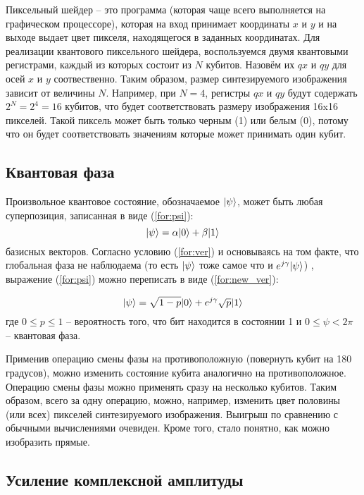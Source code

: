 Пиксельный шейдер -- это программа (которая чаще всего выполняется на графическом процессоре), которая на вход принимает координаты $x$ и $y$ и на выходе выдает цвет пикселя, находящегося в заданных координатах. Для реализации квантового пиксельного шейдера, воспользуемся двумя квантовыми регистрами, каждый из которых состоит из $N$ кубитов. Назовём их $qx$ и $qy$ для осей $x$ и $y$ соотвественно. Таким образом, размер синтезируемого изображения зависит от величины $N$. Например, при $N = 4$, регистры $qx$ и $qy$ будут содержать $2^N = 2^4 = 16$ кубитов, что будет соответствовать размеру изображения 16x16 пикселей. Такой пиксель может быть только черным (1) или белым (0), потому что он будет соответствовать значениям которые может принимать один кубит. 

\subsection{Квантовая фаза}

Произвольное квантовое состояние, обозначаемое $\lvert\psi\rangle$, может быть любая суперпозиция, записанная в виде (\ref{for:psi}):
\begin{equation}
\label{for:psi}
\lvert\psi\rangle = \alpha\lvert0\rangle + \beta\lvert1\rangle
\end{equation}
 базисных векторов. Согласно условию (\ref{for:ver}) и основываясь на том факте, что глобальная фаза не наблюдаема (то есть $\lvert\psi\rangle$ тоже самое что и $e^{j\gamma}\lvert\psi\rangle$) \cite{global-phase}, выражение (\ref{for:psi}) можно переписать в виде (\ref{for:new_ver}):
 
\begin{equation} 
\label{for:new_ver}
\lvert\psi\rangle = \sqrt{1 - p}\lvert0\rangle + e^{j\gamma}\sqrt{p}\lvert1\rangle
\end{equation} где $0 \leq p \leq 1$ -- вероятность того, что бит находится в состоянии 1 и $0 \leq \psi < 2\pi$ -- квантовая фаза.

Применив операцию смены фазы на противоположную (повернуть кубит на 180 градусов), можно изменить состояние кубита аналогично на противоположное. Операцию смены фазы можно применять сразу на несколько кубитов. Таким образом, всего за одну операцию, можно, например, изменить цвет половины (или всех) пикселей синтезируемого изображения. Выигрыш по сравнению с обычными вычислениями очевиден. Кроме того, стало понятно, как можно изобразить прямые. 

\subsection{Усиление комплексной амплитуды}


